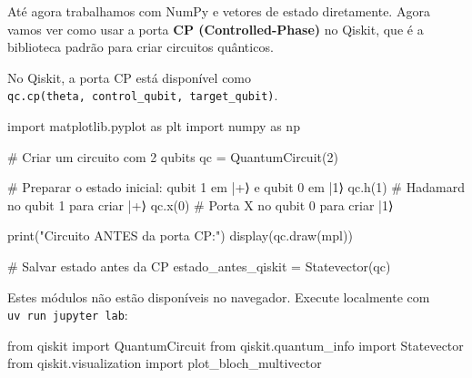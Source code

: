 \documentclass[
  brazilian,
]{report}
\newenvironment{Shaded}{\begin{snugshade}}{\end{snugshade}}
\newcommand{\ImportTok}[1]{\textcolor[rgb]{0.00,0.46,0.62}{#1}}
\newcommand{\NormalTok}[1]{\textcolor[rgb]{0.00,0.23,0.31}{#1}}
\begin{document}
Até agora trabalhamos com NumPy e vetores de estado diretamente. Agora
vamos ver como usar a porta \textbf{CP (Controlled-Phase)} no Qiskit,
que é a biblioteca padrão para criar circuitos quânticos.

No Qiskit, a porta CP está disponível como
\texttt{qc.cp(theta,\ control\_qubit,\ target\_qubit)}.

\begin{Shaded}
\begin{Highlighting}[]
\NormalTok{import matplotlib.pyplot as plt}
\NormalTok{import numpy as np}

\NormalTok{\# Criar um circuito com 2 qubits}
\NormalTok{qc = QuantumCircuit(2)}

\NormalTok{\# Preparar o estado inicial: qubit 1 em |+⟩ e qubit 0 em |1⟩}
\NormalTok{qc.h(1)      \# Hadamard no qubit 1 para criar |+⟩}
\NormalTok{qc.x(0)      \# Porta X no qubit 0 para criar |1⟩}

\NormalTok{print("Circuito ANTES da porta CP:")}
\NormalTok{display(qc.draw(\textquotesingle{}mpl\textquotesingle{}))}

\NormalTok{\# Salvar estado antes da CP}
\NormalTok{estado\_antes\_qiskit = Statevector(qc)}
\end{Highlighting}
\end{Shaded}

\begin{tcolorbox}[enhanced jigsaw, arc=.35mm, bottomrule=.15mm, bottomtitle=1mm, breakable, colback=white, colbacktitle=quarto-callout-note-color!10!white, colframe=quarto-callout-note-color-frame, coltitle=black, left=2mm, leftrule=.75mm, opacityback=0, opacitybacktitle=0.6, rightrule=.15mm, title=\textcolor{quarto-callout-note-color}{\faInfo}\hspace{0.5em}{🔒 Imports do Qiskit (requerem execução local)}, titlerule=0mm, toprule=.15mm, toptitle=1mm]

Estes módulos não estão disponíveis no navegador. Execute localmente com
\texttt{uv\ run\ jupyter\ lab}:

\begin{Shaded}
\begin{Highlighting}[]
\ImportTok{from}\NormalTok{ qiskit }\ImportTok{import}\NormalTok{ QuantumCircuit}
\ImportTok{from}\NormalTok{ qiskit.quantum\_info }\ImportTok{import}\NormalTok{ Statevector}
\ImportTok{from}\NormalTok{ qiskit.visualization }\ImportTok{import}\NormalTok{ plot\_bloch\_multivector}
\end{Highlighting}
\end{Shaded}

\end{tcolorbox}
\end{document}
